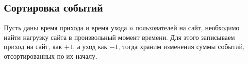 \documentclass[12pt]{article}
\begin{document}
\subsection{Сортировка событий}

\begin{algorithm}
	Пусть даны время прихода и время ухода $n$ пользователей на сайт,
	необходимо найти нагрузку сайта в произвольный момент времени. Для
	этого записываем приход на сайт, как $+1$, а уход как $-1$, тогда
	храним изменения суммы событий, отсортированных по их началу.
\end{algorithm}
\end{document}
